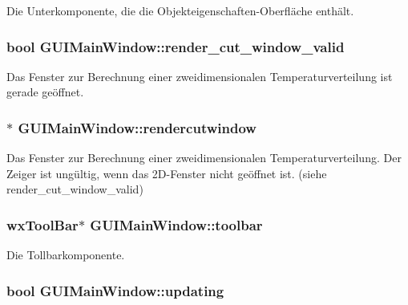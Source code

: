 Die Unterkomponente, die die Objekteigenschaften-\/\-Oberfläche enthält. \hypertarget{classGUIMainWindow_a4f08d8e4294955a3cc0b071dd3cad0d2}{
\subsubsection[{render\-\_\-cut\-\_\-window\-\_\-valid}]{\setlength{\rightskip}{0pt plus 5cm}bool G\-U\-I\-Main\-Window\-::render\-\_\-cut\-\_\-window\-\_\-valid\hspace{0.3cm}{\ttfamily [private]}}}\label{classGUIMainWindow_a4f08d8e4294955a3cc0b071dd3cad0d2}
Das Fenster zur Berechnung einer zweidimensionalen Temperaturverteilung ist gerade geöffnet. \hypertarget{classGUIMainWindow_a649cb92f27688772174659601188ac2d}{
\subsubsection[{rendercutwindow}]{$\ast$ G\-U\-I\-Main\-Window\-::rendercutwindow\hspace{0.3cm}{\ttfamily [private]}}}\label{classGUIMainWindow_a649cb92f27688772174659601188ac2d}
Das Fenster zur Berechnung einer zweidimensionalen Temperaturverteilung. Der Zeiger ist ungültig, wenn das 2\-D-\/\-Fenster nicht geöffnet ist. (siehe render\-\_\-cut\-\_\-window\-\_\-valid) \hypertarget{classGUIMainWindow_a8a8638fa87b4080e2242812f3d7e469e}{
\subsubsection[{toolbar}]{\setlength{\rightskip}{0pt plus 5cm}wx\-Tool\-Bar$\ast$ G\-U\-I\-Main\-Window\-::toolbar\hspace{0.3cm}{\ttfamily [private]}}}\label{classGUIMainWindow_a8a8638fa87b4080e2242812f3d7e469e}
Die Tollbarkomponente. \hypertarget{classGUIMainWindow_afdc35b04c0fe94e4d0080f659ecbce8c}{
\subsubsection[{updating}]{\setlength{\rightskip}{0pt plus 5cm}bool G\-U\-I\-Main\-Window\-::updating\hspace{0.3cm}{\ttfamily [private]}}}\label{classGUIMainWindow_afdc35b04c0fe94e4d0080f659ecbce8c}
